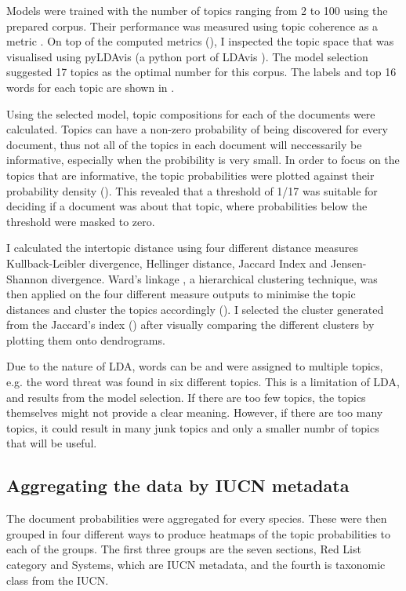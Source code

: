 Models were trained with the number of topics ranging from 2 to 100 using the prepared corpus. Their performance was measured using topic coherence as a metric \parencite{roder2015exploring}. On top of the computed metrics (), I inspected the topic space that was visualised using pyLDAvis (a python port of LDAvis \parencite{sievert2014ldavis}). The model selection suggested 17 topics as the optimal number for this corpus. The labels and top 16 words for each topic are shown in .

Using the selected model, topic compositions for each of the documents were calculated. Topics can have a non-zero probability of being discovered for every document, thus not all of the topics in each document will neccessarily be informative, especially when the probibility is very small. In order to focus on the topics that are informative, the topic probabilities were plotted against their probability density (). This revealed that a threshold of 1/17 was suitable for deciding if a document was about that topic, where probabilities below the threshold were masked to zero.

I calculated the intertopic distance using four different distance measures Kullback-Leibler divergence, Hellinger distance, Jaccard Index and Jensen-Shannon divergence. Ward's linkage \parencite{ward1963hierarchical}, a hierarchical clustering technique, was then applied on the four different measure outputs to minimise the topic distances and cluster the topics accordingly (). I selected the cluster generated from the Jaccard's index () after visually comparing the different clusters by plotting them onto dendrograms. 

Due to the nature of LDA, words can be and were assigned to multiple topics, e.g. the word threat was found in six different topics. This is a limitation of LDA, and results from the model selection. If there are too few topics, the topics themselves might not provide a clear meaning. However, if there are too many topics, it could result in many junk topics and only a smaller numbr of topics that will be useful.

\subsection{Aggregating the data by IUCN metadata}
The document probabilities were aggregated for every species. These were then grouped in four different ways to produce heatmaps of the topic probabilities to each of the groups. The first three groups are the seven sections, Red List category and Systems, which are IUCN metadata, and the fourth is taxonomic class from the IUCN.

